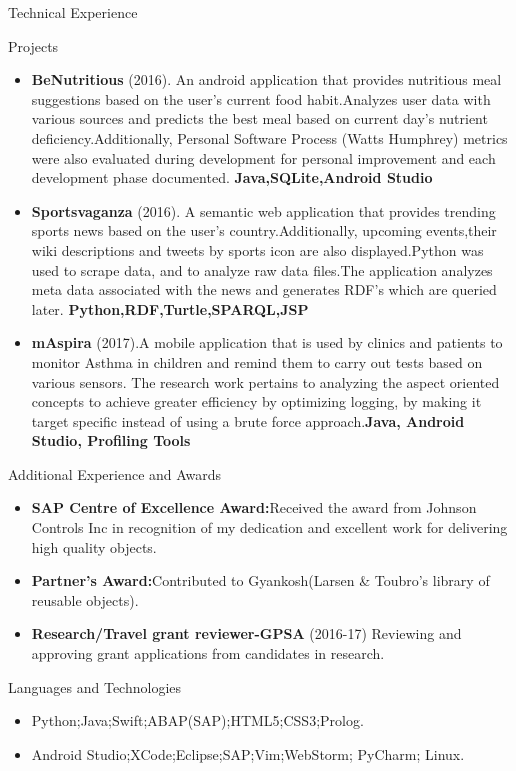 \documentclass[]{nakulcv}
\begin{document}
	\begin{cvsection}{Technical Experience}
		\begin{cvsubsection}{Projects}{}{}
			\begin{itemize}
				\item \textbf{BeNutritious} (2016). An android application that provides nutritious meal suggestions based on the user’s current food habit.Analyzes user data with various sources and predicts the best meal based on current day's nutrient deficiency.Additionally, Personal Software Process (Watts Humphrey) metrics were also evaluated during development for personal improvement and each development phase documented. \textbf{Java,SQLite,Android Studio} 
				\item \textbf{Sportsvaganza} (2016). A semantic web application that provides trending sports news based on the user’s country.Additionally, upcoming events,their wiki descriptions and tweets by sports icon are also displayed.Python was used to scrape data, and  to analyze raw data files.The application analyzes meta data associated with the news and generates RDF’s which are queried later. \textbf{Python,RDF,Turtle,SPARQL,JSP}
				\item \textbf{mAspira} (2017).A mobile application that is used by clinics and patients to monitor Asthma in children and remind them to carry out tests based on various sensors. The research work pertains to analyzing the aspect oriented concepts to achieve greater efficiency by optimizing logging, by making it target specific instead of using a brute force approach.\textbf{Java, Android Studio, Profiling Tools}
			\end{itemize}
		\end{cvsubsection}
	\end{cvsection}
	\begin{cvsection}{Additional Experience and Awards}
		\begin{cvsubsection}{}{}{}	\begin{itemize} \item \textbf{SAP Centre of Excellence Award:}Received the award from Johnson Controls Inc in recognition of my dedication and excellent work for delivering high quality objects.  \item \textbf{Partner's Award:}Contributed to Gyankosh(Larsen \& Toubro's library of reusable objects).  \item \textbf{Research/Travel grant reviewer-GPSA} (2016-17) Reviewing and approving grant applications from candidates in research.  \end{itemize}
		\end{cvsubsection}
	\end{cvsection}
	\begin{cvsection}{Languages and Technologies}
		\begin{cvsubsection}{}{}{}	
			\begin{itemize}
				\item Python;Java;Swift;ABAP(SAP);HTML5;CSS3;Prolog.
				\item Android Studio;XCode;Eclipse;SAP;Vim;WebStorm; PyCharm; Linux.
			\end{itemize}
		\end{cvsubsection}
	\end{cvsection}
\end{document}

